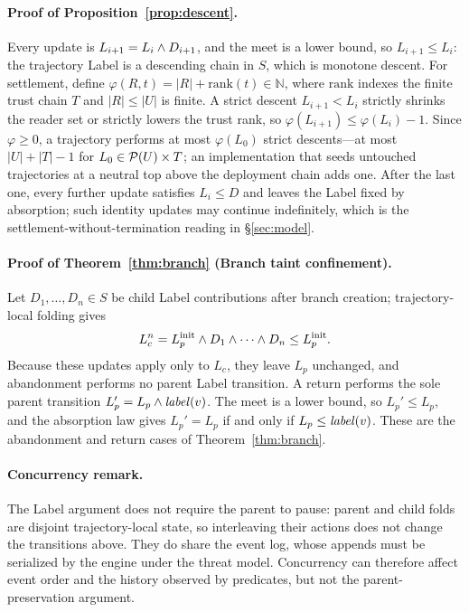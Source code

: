 \paragraph{Proof of Proposition~\ref{prop:descent}.}
Every update is $L_{i+1}=L_i\wedge D_{i+1}$, and the meet is a lower bound, so $L_{i+1}\le L_i$: the trajectory Label is a descending chain in $S$, which is monotone descent. For settlement, define $\varphi(R,t)=|R|+\mathrm{rank}(t)\in\mathbb{N}$, where $\mathrm{rank}$ indexes the finite trust chain $T$ and $|R|\le|U|$ is finite. A strict descent $L_{i+1}<L_i$ strictly shrinks the reader set or strictly lowers the trust rank, so $\varphi(L_{i+1})\le\varphi(L_i)-1$. Since $\varphi\ge 0$, a trajectory performs at most $\varphi(L_0)$ strict descents---at most $|U|+|T|-1$ for $L_0\in\mathcal{P}(U)\times T$; an implementation that seeds untouched trajectories at a neutral top above the deployment chain adds one. After the last one, every further update satisfies $L_i\le D$ and leaves the Label fixed by absorption; such identity updates may continue indefinitely, which is the settlement-without-termination reading in \S\ref{sec:model}.

\paragraph{Proof of Theorem~\ref{thm:branch} (Branch taint confinement).}
Let $D_1,\ldots,D_n\in S$ be child Label contributions after branch creation; trajectory-local folding gives
\[
  L_c^n = L_p^{\mathrm{init}} \wedge D_1 \wedge \cdots \wedge D_n
          \le L_p^{\mathrm{init}}.
\]
Because these updates apply only to $L_c$, they leave $L_p$ unchanged, and abandonment performs no parent Label transition. A return performs the sole parent transition $L_p'=L_p\wedge\mathit{label}(v)$. The meet is a lower bound, so $L_p'\le L_p$, and the absorption law gives $L_p'=L_p$ if and only if $L_p\le\mathit{label}(v)$. These are the abandonment and return cases of Theorem~\ref{thm:branch}.

\paragraph{Concurrency remark.}
The Label argument does not require the parent to pause: parent and child folds are disjoint trajectory-local state, so interleaving their actions does not change the transitions above.  They do share the event log, whose appends must be serialized by the engine under the threat model.  Concurrency can therefore affect event order and the history observed by predicates, but not the parent-preservation argument.

